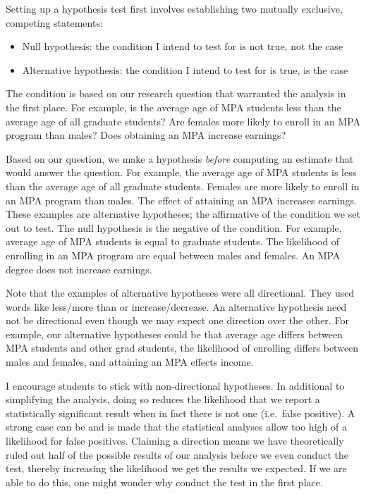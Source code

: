 \documentclass[
]{book}
\providecommand{\tightlist}{%
  \setlength{\itemsep}{0pt}\setlength{\parskip}{0pt}}
\begin{document}
Setting up a hypothesis test first involves establishing two mutually exclusive, competing statements:

\begin{itemize}
\tightlist
\item
  Null hypothesis: the condition I intend to test for is not true, not the case
\item
  Alternative hypothesis: the condition I intend to test for is true, is the case
\end{itemize}

The condition is based on our research question that warranted the analysis in the first place. For example, is the average age of MPA students less than the average age of all graduate students? Are females more likely to enroll in an MPA program than males? Does obtaining an MPA increase earnings?

Based on our question, we make a hypothesis \emph{before} computing an estimate that would answer the question. For example, the average age of MPA students is less than the average age of all graduate students. Females are more likely to enroll in an MPA program than males. The effect of attaining an MPA increases earnings. These examples are alternative hypotheses; the affirmative of the condition we set out to test. The null hypothesis is the negative of the condition. For example, average age of MPA students is equal to graduate students. The likelihood of enrolling in an MPA program are equal between males and females. An MPA degree does not increase earnings.

Note that the examples of alternative hypotheses were all directional. They used words like less/more than or increase/decrease. An alternative hypothesis need not be directional even though we may expect one direction over the other. For example, our alternative hypotheses could be that average age differs between MPA students and other grad students, the likelihood of enrolling differs between males and females, and attaining an MPA effects income.

I encourage students to stick with non-directional hypotheses. In additional to simplifying the analysis, doing so reduces the likelihood that we report a statistically significant result when in fact there is not one (i.e.~false positive). A strong case can be and is made that the statistical analyses allow too high of a likelihood for false positives. Claiming a direction means we have theoretically ruled out half of the possible results of our analysis before we even conduct the test, thereby increasing the likelihood we get the results we expected. If we are able to do this, one might wonder why conduct the test in the first place.
\end{document}
